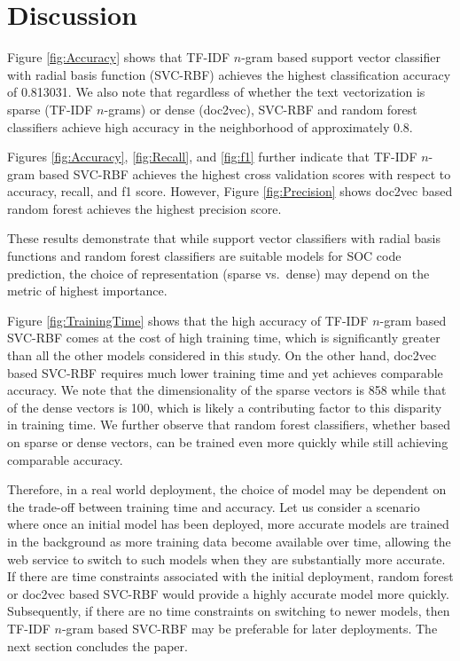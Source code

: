 \section{Discussion}
\label{sec:Discussion}

Figure \ref{fig:Accuracy} shows that TF-IDF $n$-gram based support vector classifier with radial basis function (SVC-RBF) achieves the highest classification accuracy of 0.813031. We also note that regardless of whether the text vectorization is sparse (TF-IDF $n$-grams) or dense (doc2vec), SVC-RBF and random forest classifiers achieve high accuracy in the neighborhood of approximately 0.8. 

Figures \ref{fig:Accuracy}, \ref{fig:Recall}, and \ref{fig:f1} further indicate that TF-IDF $n$-gram based SVC-RBF achieves the highest cross validation scores with respect to accuracy, recall, and f1 score. However, Figure \ref{fig:Precision} shows doc2vec based random forest achieves the highest precision score.

These results demonstrate that while support vector classifiers with radial basis functions and random forest classifiers are suitable models for SOC code prediction, the choice of representation (sparse vs.~dense) may depend on the metric of highest importance.

Figure \ref{fig:TrainingTime} shows that the high accuracy of TF-IDF $n$-gram based SVC-RBF comes at the cost of high training time, which is significantly greater than all the other models considered in this study. On the other hand, doc2vec based SVC-RBF requires much lower training time and yet achieves comparable accuracy. We note that the dimensionality of the sparse vectors is 858 while that of the dense vectors is 100, which is likely a contributing factor to this disparity in training time. We further observe that random forest classifiers, whether based on sparse or dense vectors, can be trained even more quickly while still achieving comparable accuracy.

Therefore, in a real world deployment, the choice of model may be dependent on the trade-off between training time and accuracy. Let us consider a scenario where once an initial model has been deployed, more accurate models are trained in the background as more training data become available over time, allowing the web service to switch to such models when they are substantially more accurate. If there are time constraints associated with the initial deployment, random forest or doc2vec based SVC-RBF would provide a highly accurate model more quickly. Subsequently, if there are no time constraints on switching to newer models, then TF-IDF $n$-gram based SVC-RBF may be preferable for later deployments. The next section concludes the paper. 

